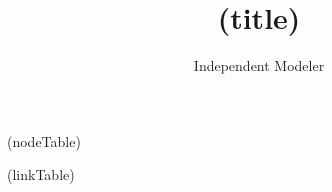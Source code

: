 \documentclass{article}
\title{(title)}
\author{Independent Modeler}
\begin{document}
\maketitle


(nodeTable)

(linkTable)
\end{document}
